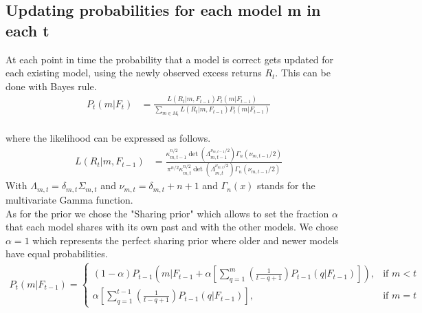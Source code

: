 \subsection{Updating probabilities for each model m in each t}
At each point in time the probability that a model is correct gets updated for each existing model, using the newly observed excess returns $R_t$. This can be done with Bayes rule. \\
\begin{align*}
P_t(m | F_t) &= \frac{L(R_t | m, F_{t-1})P_t(m|F_{t-1})}{\sum_{m \in M_t} L(R_t | m, F_{t-1})P_t(m|F_{t-1})}
\end{align*}
\\
where the likelihood can be expressed as follows.\\
\begin{align*}
 L(R_t | m, F_{t-1}) &= \frac{ \kappa_{m,t-1}^{n/2} \det(\Lambda_{m,t-1}^{\nu_{m,t-1}/2}) \Gamma_n (\nu_{m,t-1}/2)}{\pi^{n/2} \kappa_{m,t}^{n/2} \det(\Lambda_{m,t}^{\nu_{m,t}/2}) \Gamma_n (\nu_{m,t-1}/2) }
\end{align*}
With $\Lambda_{m,t} = \delta_{m,t}\Sigma_{m,t}$ and $\nu_{m,t} = \delta_{m,t} + n + 1$ and $\Gamma_n(x)$ stands for the multivariate Gamma function. \\
As for the prior we chose the "Sharing prior" which allows to set the fraction $\alpha$ that each model shares with its own past and with the other models. We chose $\alpha = 1$ which represents the perfect sharing prior where older and newer models have equal probabilities. \\
\begin{align*}
    P_t(m | F_{t-1})=\left\{
                \begin{array}{ll}
                  (1-\alpha) P_{t-1}(m |F_{t-1} + \alpha [\sum_{q=1}^{m} (\frac{1}{t-q+1}) P_{t-1}(q | F_{t-1})]), &\text{if }m<t\\
                  \alpha[\sum_{q=1}^{t-1}(\frac{1}{t-q+1})P_{t-1}(q | F_{t-1})],  &\text{if } m=t
                \end{array}
              \right.
\end{align*}


